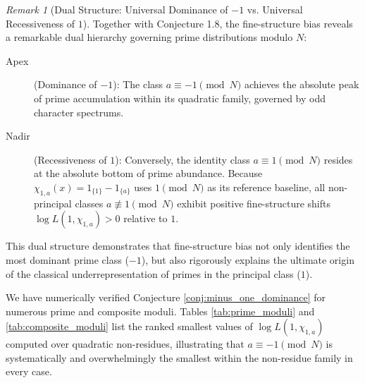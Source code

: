 \documentclass[12pt,reqno]{amsart}
\theoremstyle{definition}
\theoremstyle{remark}
\newtheorem{remark}[theorem]{Remark}
\numberwithin{equation}{section}
\begin{document}
\begin{remark}[Dual Structure: Universal Dominance of $-1$ vs. Universal Recessiveness of $1$]
Together with Conjecture 1.8, the fine-structure bias reveals a remarkable dual hierarchy governing prime distributions modulo $N$:
\begin{description}
\item[Apex] (Dominance of $-1$): The class $a \equiv -1 \pmod N$ achieves the absolute peak of prime accumulation within its quadratic family, governed by odd character spectrums.
\item[Nadir] (Recessiveness of $1$): Conversely, the identity class $a \equiv 1 \pmod N$ resides at the absolute bottom of prime abundance. Because $\chi_{1,a}(x) = 1_{\{1\}} - 1_{\{a\}}$ uses $1 \pmod N$ as its reference baseline, all non-principal classes $a \not\equiv 1 \pmod N$ exhibit positive fine-structure shifts $\log L(1, \chi_{1,a}) > 0$ relative to $1$.
\end{description}
This dual structure demonstrates that fine-structure bias not only identifies the most dominant prime class ($-1$), but also rigorously explains the ultimate origin of the classical underrepresentation of primes in the principal class ($1$).
\end{remark}

We have numerically verified Conjecture \ref{conj:minus_one_dominance} for numerous prime and composite moduli. Tables \ref{tab:prime_moduli} and \ref{tab:composite_moduli} list the ranked smallest values of $\log L(1, \chi_{1,a})$ computed over quadratic non-residues, illustrating that $a \equiv -1 \pmod N$ is systematically and overwhelmingly the smallest within the non-residue family in every case.

\begin{table}[htbp]
\centering
\caption{The ranking of small values of $\log L(1, \chi_{1,a})$ among quadratic non-residues for prime  $N$.}
\label{tab:prime_moduli}
\end{table}
\end{document}
